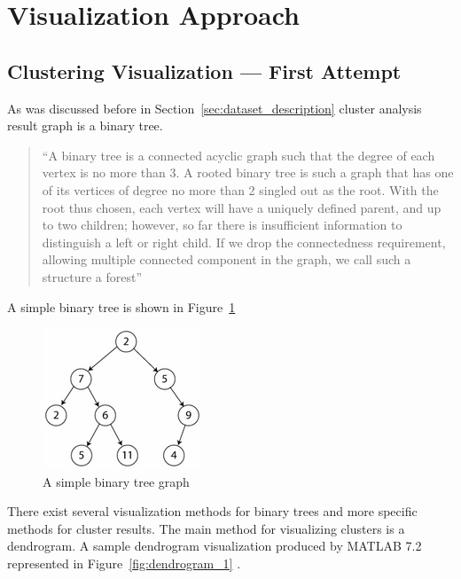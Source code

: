 \newpage
\section{Visualization Approach}
\label{sec:solution}

\subsection{Clustering Visualization --- First Attempt}
\label{sec:probe}

As was discussed before in Section~\ref{sec:dataset_description} cluster analysis result graph is a binary tree.

\begin{quotation}
``A binary tree is a connected acyclic graph such that the degree of each vertex is no more than 3.
A rooted binary tree is such a graph that has one of its vertices of degree no more than 2 singled out as the root.
With the root thus chosen, each vertex will have a uniquely defined parent, and up to two children; however, so far there is insufficient information to distinguish a left or right child.
If we drop the connectedness requirement, allowing multiple connected component in the graph, we call such a structure a forest''~\cite{BINARY_TREE}
\end{quotation}

A simple binary tree is shown in Figure~\ref{fig:simple_binary_tree}

\begin{figure}[h!]
\centering
\includegraphics[scale=1.0]{pictures/simple_binary_tree.png}
\caption{A simple binary tree graph}
\label{fig:simple_binary_tree}
\end{figure}

There exist several visualization methods for binary trees and more specific methods for cluster results.
The main method for visualizing clusters is a dendrogram. A sample dendrogram visualization produced by MATLAB 7.2 represented in Figure~\ref{fig:dendrogram_1} .

